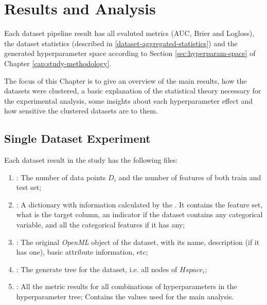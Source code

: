 \chapter{Results and Analysis}
\label{cap:results}

Each dataset pipeline result has all evaluted metrics (AUC, Brier and Logloss), the dataset statistics (described in \ref{dataset-aggregated-statistics}) and the generated hyperparameter space according to Section \ref{sec:hyperparam-space} of Chapter \ref{cap:study-methodology}.

The focus of this Chapter is to give an overview of the main results, how the datasets were clustered, a basic explanation of the statistical theory necessary for the experimental analysis,  some insights about each hyperparameter effect and how sensitive the clustered datasets are to them.


\section{Single Dataset Experiment}

Each dataset result in the study has the following files:

\begin{enumerate}
    \item \textbf{}: The number of data points $D_i$ and the number of features of both train and test set;
    \item \textbf{}: A dictionary with information calculated by the . It contains the feature set, what is the target column, an indicator if the dataset contains any categorical variable, and all the categorical features if it has any;
    \item \textbf{}: The original \textit{OpenML} object of the dataset, with its name, description (if it has one), basic attribute information, etc;
    \item \textbf{}: The generate tree for the dataset, i.e. all nodes of $Hspace_i$;
    \item \textbf{}: All the metric results for all combinations of hyperparameters in the hyperparameter tree; Contains the values used for the main analysis.
\end{enumerate}

